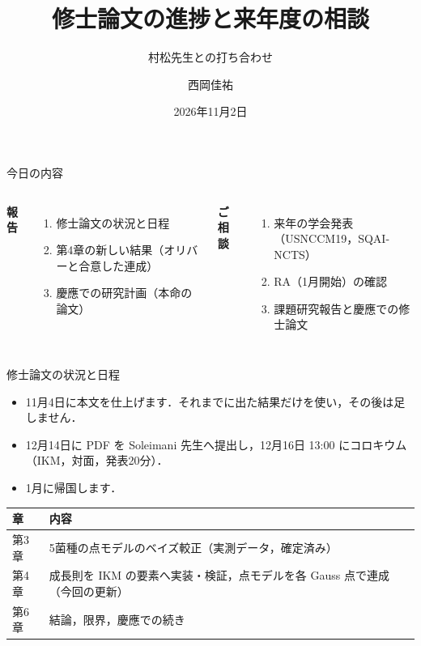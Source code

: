 \documentclass[aspectratio=169,11pt]{beamer}
\title{修士論文の進捗と来年度の相談}
\subtitle{村松先生との打ち合わせ}
\author[西岡佳祐]{西岡佳祐}
\institute[IKM, LUH / 慶應]{%
\small ライプニッツ大学ハノーファー 連続体力学研究所（IKM）\\
\small 慶應義塾大学}
\date{2026年11月2日}
\begin{document}
\maketitle

\begin{frame}{今日の内容}
\begin{columns}[T]
\textbf{報告}
\begin{enumerate}\setlength{\itemsep}{6pt}
  \item 修士論文の状況と日程
  \item 第4章の新しい結果（オリバーと合意した連成）
  \item 慶應での研究計画（本命の論文）
\end{enumerate}
\textbf{ご相談}
\begin{enumerate}\setlength{\itemsep}{6pt}
  \item 来年の学会発表（USNCCM19，SQAI-NCTS）
  \item RA（1月開始）の確認
  \item 課題研究報告と慶應での修士論文
\end{enumerate}
\end{columns}
\end{frame}

\begin{frame}{修士論文の状況と日程}
\begin{itemize}\setlength{\itemsep}{6pt}
  \item 11月4日に本文を仕上げます．それまでに出た結果だけを使い，その後は足しません．
  \item 12月14日に PDF を Soleimani 先生へ提出し，12月16日 13:00 にコロキウム（IKM，対面，発表20分）．
  \item 1月に帰国します．
\end{itemize}
\vspace{6pt}
\begin{tabular}{ll}
\toprule
章 & 内容 \\
\midrule
第3章 & 5菌種の点モデルのベイズ較正（実測データ，確定済み）\\
第4章 & 成長則を IKM の要素へ実装・検証，点モデルを各 Gauss 点で連成（今回の更新）\\
第6章 & 結論，限界，慶應での続き \\
\bottomrule
\end{tabular}
\end{frame}
\end{document}
